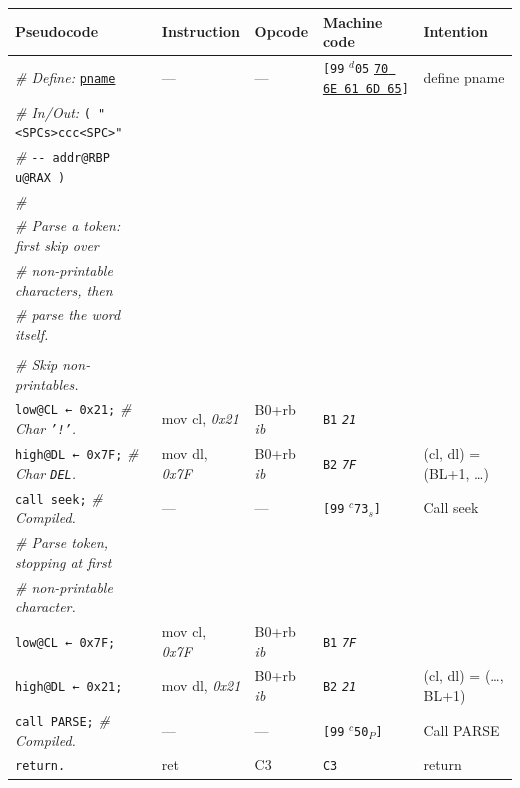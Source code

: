 \documentclass[a4paper,12pt,final]{article}
\begin{document}
\begin{table}[!htbp] \begin{adjustwidth}{-1cm}{-1cm} \fontsize{10}{12.000000}\selectfont
\begin{center}
\begin{tabular}{l|ll|lH}
\textbf{Pseudocode} & \textbf{Instruction} & \textbf{Opcode} & \textbf{Machine code} & \textbf{Intention}\\[0pt]
\hline
\emph{\# Define:} \uline{\texttt{pname}} & --- & --- & \texttt{[99} \(^{d}\)​\texttt{05} \uline{\texttt{70 6E 61 6D 65}}​\texttt{]} & define pname\\[0pt]
\emph{\# In/Out:}   \texttt{( "<SPCs>ccc<SPC>"} &  &  &  & \\[0pt]
\emph{\#}\hspace{3.35em} \texttt{-​- addr@RBP u@RAX )} &  &  &  & \\[0pt]
\emph{\#} &  &  &  & \\[0pt]
\emph{\# Parse a token: first skip over} &  &  &  & \\[0pt]
\emph{\# non-printable characters, then} &  &  &  & \\[0pt]
\emph{\# parse the word itself.} &  &  &  & \\[0pt]
 &  &  &  & \\[0pt]
\emph{\# Skip non-printables.} &  &  &  & \\[0pt]
\texttt{low@CL ← 0x21;}   \emph{\# Char \texttt{'!'}.} & mov cl, \emph{0x21} & B0+rb \emph{ib} & \texttt{B1} \emph{\texttt{21}} & \\[0pt]
\texttt{high@DL ← 0x7F;}  \emph{\# Char \texttt{DEL}.} & mov dl, \emph{0x7F} & B0+rb \emph{ib} & \texttt{B2} \emph{\texttt{7F}} & (cl, dl) = (BL+1, \ldots{})\\[0pt]
\texttt{call seek;}  \emph{\# Compiled.} & --- & --- & \texttt{[99} \(^{c}\)​\texttt{73}​\(_{s}\)​\texttt{]} & Call seek\\[0pt]
\emph{\# Parse token, stopping at first} &  &  &  & \\[0pt]
\emph{\# non-printable character.} &  &  &  & \\[0pt]
\texttt{low@CL ← 0x7F;} & mov cl, \emph{0x7F} & B0+rb \emph{ib} & \texttt{B1} \emph{\texttt{7F}} & \\[0pt]
\texttt{high@DL ← 0x21;} & mov dl, \emph{0x21} & B0+rb \emph{ib} & \texttt{B2} \emph{\texttt{21}} & (cl, dl) = (\ldots{}, BL+1)\\[0pt]
\texttt{call PARSE;}  \emph{\# Compiled.} & --- & --- & \texttt{[99} \(^{c}\)​\texttt{50}​\(_{P}\)​\texttt{]} & Call PARSE\\[0pt]
\texttt{return.} & ret & C3 & \texttt{C3} & return\\[0pt]
\end{tabular}

\end{center}
\normalsize \end{adjustwidth} \end{table} \vspace{0}
\end{document}
